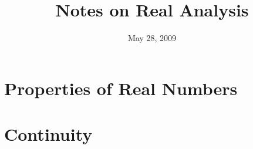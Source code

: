 \documentclass{article}
\title{Notes on Real Analysis}
\date{May 28, 2009}
\begin{document}
\maketitle
\tableofcontents
\vfill\eject
\section{Properties of Real Numbers}

\section{Continuity}


\nocite{kennethRoss}


\end{document}
